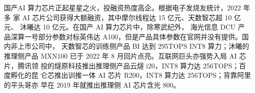 国产AI 算力芯片正起星星之火，投融资热度高企。根据电子发烧友统计，2022 年多
家 AI 芯片公司获得大额融资，其中摩尔线程达 15 亿元、天数智芯超 10 亿元、
沐曦达 10 亿元。在国产 AI 算力芯片中，除寒武纪外，
海光信息 DCU 产品深算一号部分参数对标英伟达 A100，但是产品具体参数在官网并没有提供。国内非上市公司中，
天数智芯的训练侧产品 BI 达到 295TOPS INT8 算力；沐曦的推理侧产品
MXN100 已于 2022 年 8 月回片点亮。互联网巨头亦强势入局 AI 芯片，腾讯领
投的燧原科技推出推理侧产品云燧 i20，INT8 算力达 256TOPS；百度孵化的昆
仑芯推出训推一体 AI 芯片 R200，INT8 算力达 256TOPS；背靠阿里的平头哥亦
早在 2019 年就推出推理侧 AI 芯片含光 800。
